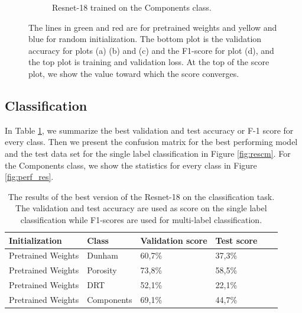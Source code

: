 \begin{figure}
{\begin{subfigure}[b]{.6\textwidth}
\caption{Resnet-18 trained on the Components class.}
\label{fig:resinit_comp}
\end{subfigure}%
}
\caption[Training and validation plots for Resnet-18]{The lines in green and red are for pretrained weights and yellow and blue for random initialization. The bottom plot is the validation accuracy for plots (a) (b) and (c) and the F1-score for plot (d), and the top plot is training  and validation loss. At the top of the score plot, we show the value toward which the score converges. }
\label{fig:plotres}
\end{figure}

\subsection{Classification}
In Table \ref{tab:resbest}, we summarize the best validation and test accuracy or F-1 score for every class. Then we present the confusion matrix for the best performing model and the test data set for the single label classification in Figure \ref{fig:rescm}. For the Components class, we show the statistics for every class in Figure \ref{fig:perf_res}. 

\begin{table}
\caption[Scores of best performing Resnet-18]{\label{tab:resbest} The results of the best version of the Resnet-18 on the classification task. The validation and test accuracy are used as score on the single label classification while F1-scores are used for multi-label classification.}
\centering
\begin{tabular}[b]{| l | l | l | l | l |}
\hline
    Initialization & Class & Validation score & Test score \ \\ \hline
    Pretrained Weights & Dunham &  60,7\%  & 37,3\% \\ \hline
    Pretrained Weights & Porosity & 73,8\%  &  58,5\% \\ \hline
    Pretrained Weights &DRT & 52,1\% &  22,1\% \\ \hline
    Pretrained Weights &Components & 69,1\% &  44,7\% \\ \hline
\end{tabular} 
\end{table}

